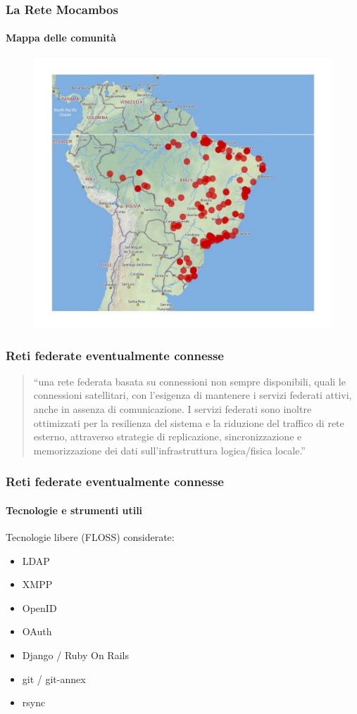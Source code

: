 \documentclass{beamer}
\begin{document}
\begin{frame}
  \frametitle{La Rete Mocambos}
  \framesubtitle{Mappa delle comunità}
	\begin{figure}
		\includegraphics[height=0.7\textheight]{./Figure/MappaRedeMocambos.pdf}
	\end{figure}
\end{frame}

\begin{frame}
  \frametitle{Reti federate eventualmente connesse}
  \begin{quote}
    ``una rete federata basata su connessioni non sempre disponibili,
    quali le connessioni satellitari, con l'esigenza di mantenere i
    servizi federati attivi, anche in assenza di comunicazione. I
    servizi federati sono inoltre ottimizzati per la resilienza del
    sistema e la riduzione del traffico di rete esterno, attraverso
    strategie di replicazione, sincronizzazione e memorizzazione dei
    dati sull'infrastruttura logica/fisica locale.''
    \end{quote}
\end{frame}


{
\begin{frame}
  \frametitle{Reti federate eventualmente connesse}
  \framesubtitle{Tecnologie e strumenti utili}
  Tecnologie libere (FLOSS) considerate:
  \begin{itemize}
    \item LDAP
    \item XMPP
    \item OpenID
    \item OAuth
    \item Django / Ruby On Rails
    \item git / git-annex
    \item rsync
    \end{itemize}
\end{frame}
}
\end{document}
